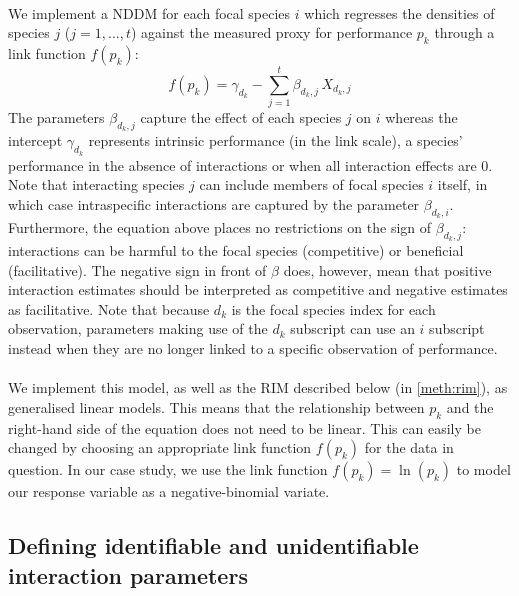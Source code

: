 \documentclass[a4,12pt]{article}
\begin{document}
\begin{refsection}
        \paragraph{}
        We implement a NDDM for each focal species $i$ which regresses the densities of species $j$ ($j = 1, ..., t$) against the measured proxy for performance $p_{k}$ through a link function $f(p_k)$:
        \begin{equation}
        f(p_{k}) = \gamma_{d_k} - \sum_{j=1}^{t} \beta_{d_k,j} \, X_{d_k,j}
        \label{nddm}
        \end{equation}
        The parameters $\beta_{d_k,j}$ capture the effect of each species $j$ on $i$ whereas the intercept $\gamma_{d_k}$ represents intrinsic performance (in the link scale), a species' performance in the absence of interactions or when all interaction effects are $0$. Note that interacting species $j$ can include members of focal species $i$ itself, in which case intraspecific interactions are captured by the parameter $\beta_{d_k,i}$. Furthermore, the equation above places no restrictions on the sign of $\beta_{d_k, j}$: interactions can be harmful to the focal species (competitive) or beneficial (facilitative). The negative sign in front of $\beta$ does, however, mean that positive interaction estimates should be interpreted as competitive and negative estimates as facilitative. Note that because $d_k$ is the focal species index for each observation, parameters making use of the $d_k$ subscript can use an $i$ subscript instead when they are no longer linked to a specific observation of performance.

        \paragraph{}
        We implement this model, as well as the RIM described below (in \ref{meth:rim}), as generalised linear models. This means that the relationship between $p_k$ and the right-hand side of the equation does not need to be linear. This can easily be changed by choosing an appropriate link function $f(p_k)$ for the data in question. In our case study, we use the link function $f(p_k) = \ln(p_k)$ to model our response variable as a negative-binomial variate.
              

    \subsection{Defining identifiable and unidentifiable interaction parameters}
    \label{meth:id_params}


\end{refsection}
\end{document}
